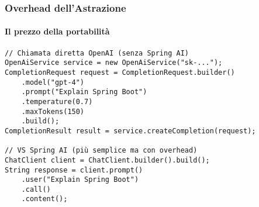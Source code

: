 %
\begin{frame}[t,fragile] \frametitle{Overhead dell'Astrazione}
	{\small
		\framesubtitle{Il prezzo della portabilità}
\begin{verbatim}
// Chiamata diretta OpenAI (senza Spring AI)
OpenAiService service = new OpenAiService("sk-...");
CompletionRequest request = CompletionRequest.builder()
    .model("gpt-4")
    .prompt("Explain Spring Boot")
    .temperature(0.7)
    .maxTokens(150)
    .build();
CompletionResult result = service.createCompletion(request);

// VS Spring AI (più semplice ma con overhead)  
ChatClient client = ChatClient.builder().build();
String response = client.prompt()
    .user("Explain Spring Boot")
    .call()
    .content();
\end{verbatim}
		}
\end{frame}
